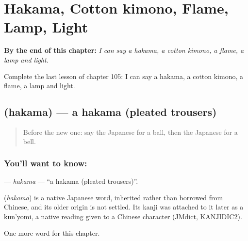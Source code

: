 
\chapter{Hakama, Cotton kimono, Flame, Lamp, Light}
\label{ch:ja-hakama-cotton-kimono-flame-lamp-light}

\begin{chapteropening}
\textbf{By the end of this chapter:} \emph{I can say a hakama, a cotton kimono, a flame, a lamp and light.}

Complete the last lesson of chapter 105: I can say a hakama, a cotton kimono, a flame, a lamp and light.
\end{chapteropening}

\section[\texorpdfstring{\ja{はかま} (hakama)}{はかま (hakama)}]{ (hakama) — a hakama (pleated trousers)}

\label{lesson:JA-C105-hakama}



\begin{quote}
Before the new one: say the Japanese for a ball, then the Japanese for a bell.
\end{quote}

\subsection*{You'll want to know: }
\textbf{} — \emph{hakama} — \textquotedblleft{}a hakama (pleated trousers)\textquotedblright{}.

\begin{cousinweb}
\textbf{} (\emph{hakama}) is a native Japanese word, inherited rather than borrowed from Chinese, and its older origin is not settled. Its kanji was attached to it later as a kun'yomi, a native reading given to a Chinese character (JMdict, KANJIDIC2).
\end{cousinweb}

\begin{grammarlens}[title={What you've built}]
One more word for this chapter.
\end{grammarlens}

